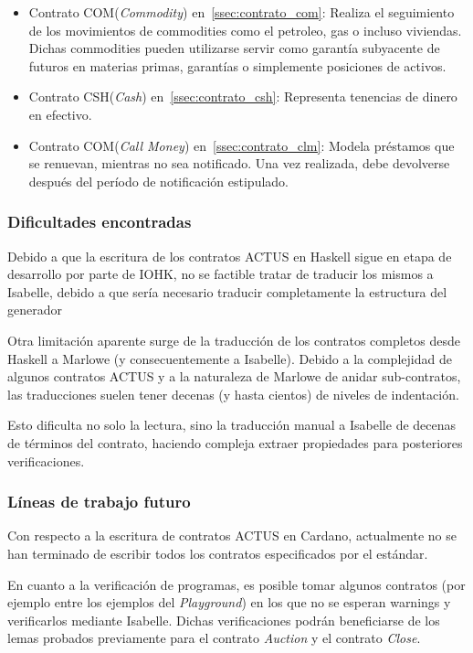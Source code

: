 \documentclass[12pt]{book}
\begin{document}
\begin{itemize}
    \item Contrato COM(\textit{Commodity}) en~\ref{ssec:contrato_com}: Realiza el seguimiento de los movimientos de commodities como el petroleo, gas o incluso viviendas. Dichas commodities pueden utilizarse servir como garantía subyacente de futuros en materias primas, garantías o simplemente posiciones de activos.
    \item Contrato CSH(\textit{Cash}) en~\ref{ssec:contrato_csh}: Representa tenencias de dinero en efectivo.
    \item Contrato COM(\textit{Call Money}) en~\ref{ssec:contrato_clm}: Modela préstamos que se renuevan, mientras no sea notificado. Una vez realizada, debe devolverse después del período de notificación estipulado.
\end{itemize}

\subsubsection{Dificultades encontradas}

Debido a que la escritura de los contratos ACTUS en Haskell sigue en etapa de desarrollo por parte de IOHK, no se factible tratar de traducir los mismos a Isabelle, debido a que sería necesario traducir completamente la estructura del generador

Otra limitación aparente surge de la traducción de los contratos completos desde Haskell a Marlowe (y consecuentemente a Isabelle). Debido a la complejidad de algunos contratos ACTUS y a la naturaleza de Marlowe de anidar sub-contratos, las traducciones suelen tener decenas (y hasta cientos) de niveles de indentación.

Esto dificulta no solo la lectura, sino la traducción manual a Isabelle de decenas de términos del contrato, haciendo compleja extraer propiedades para posteriores verificaciones.


\subsubsection{Líneas de trabajo futuro}

Con respecto a la escritura de contratos ACTUS en Cardano, actualmente no se han terminado de escribir todos los contratos especificados por el estándar.

En cuanto a la verificación de programas, es posible tomar algunos contratos (por ejemplo entre los ejemplos del \textit{Playground}) en los que no se esperan warnings y verificarlos mediante Isabelle. Dichas verificaciones podrán beneficiarse de los lemas probados previamente para el contrato \textit{Auction} y el contrato \textit{Close}.
\end{document}
